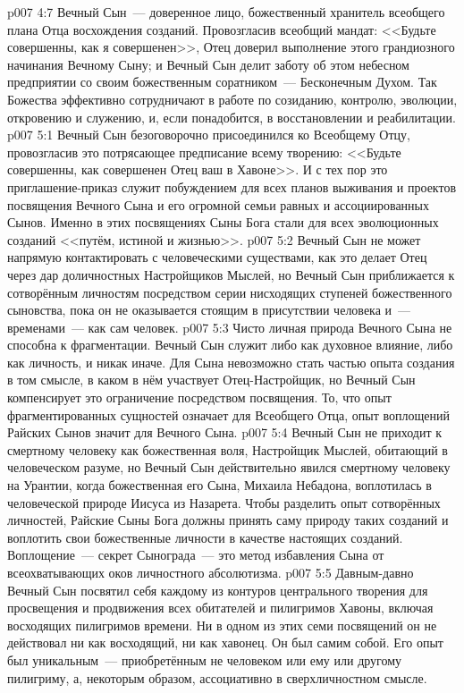 \vs p007 4:7 \pc Вечный Сын~--- доверенное лицо, божественный хранитель всеобщего плана Отца восхождения созданий. Провозгласив всеобщий мандат: <<Будьте совершенны, как я совершенен>>, Отец доверил выполнение этого грандиозного начинания Вечному Сыну; и Вечный Сын делит заботу об этом небесном предприятии со своим божественным соратником~--- Бесконечным Духом. Так Божества эффективно сотрудничают в работе по созиданию, контролю, эволюции, откровению и служению, и, если понадобится, в восстановлении и реабилитации.
\vs p007 5:1 Вечный Сын безоговорочно присоединился ко Всеобщему Отцу, провозгласив это потрясающее предписание всему творению: <<Будьте совершенны, как совершенен Отец ваш в Хавоне>>. И с тех пор это приглашение\hyp{}приказ служит побуждением для всех планов выживания и проектов посвящения Вечного Сына и его огромной семьи равных и ассоциированных Сынов. Именно в этих посвящениях Сыны Бога стали для всех эволюционных созданий <<путём, истиной и жизнью>>.
\vs p007 5:2 Вечный Сын не может напрямую контактировать с человеческими существами, как это делает Отец через дар доличностных Настройщиков Мыслей, но Вечный Сын приближается к сотворённым личностям посредством серии нисходящих ступеней божественного сыновства, пока он не оказывается стоящим в присутствии человека и~--- временами~--- как сам человек.
\vs p007 5:3 Чисто личная природа Вечного Сына не способна к фрагментации. Вечный Сын служит либо как духовное влияние, либо как личность, и никак иначе. Для Сына невозможно стать частью опыта создания в том смысле, в каком в нём участвует Отец\hyp{}Настройщик, но Вечный Сын компенсирует это ограничение посредством посвящения. То, что опыт фрагментированных сущностей означает для Всеобщего Отца, опыт воплощений Райских Сынов значит для Вечного Сына.
\vs p007 5:4 Вечный Сын не приходит к смертному человеку как божественная воля, Настройщик Мыслей, обитающий в человеческом разуме, но Вечный Сын действительно явился смертному человеку на Урантии, когда божественная  его Сына, Михаила Небадона, воплотилась в человеческой природе Иисуса из Назарета. Чтобы разделить опыт сотворённых личностей, Райские Сыны Бога должны принять саму природу таких созданий и воплотить свои божественные личности в качестве настоящих созданий. Воплощение~--- секрет Сынограда~--- это метод избавления Сына от всеохватывающих оков личностного абсолютизма.
\vs p007 5:5 \pc Давным\hyp{}давно Вечный Сын посвятил себя каждому из контуров центрального творения для просвещения и продвижения всех обитателей и пилигримов Хавоны, включая восходящих пилигримов времени. Ни в одном из этих семи посвящений он не действовал ни как восходящий, ни как хавонец. Он был самим собой. Его опыт был уникальным~--- приобретённым не  человеком или  ему или другому пилигриму, а, некоторым образом, ассоциативно в сверхличностном смысле.
